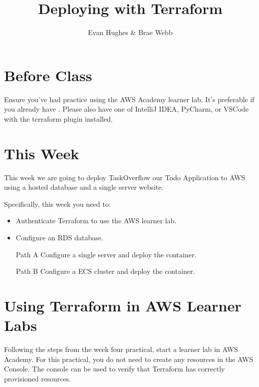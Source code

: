 \documentclass{csse4400}
\title{Deploying with Terraform}
\author{Evan Hughes \& Brae Webb}
\date{\week{3}}
\begin{document}
\maketitle

\section{Before Class}
Ensure you've had practice using the AWS Academy learner lab.
It's preferable if you already have .
Please also have one of IntelliJ IDEA, PyCharm, or VSCode with the terraform plugin installed.

\section{This Week}
This week we are going to deploy TaskOverflow our Todo Application to AWS using a hosted database and a single server website.

Specifically, this week you need to:
\begin{itemize}
    \item Authenticate Terraform to use the AWS learner lab.
    \item Configure an RDS database.
    \item [Path A] Configure a single server and deploy the container.
    \item [Path B] Configure a ECS cluster and deploy the container.
\end{itemize}

\section{Using Terraform in AWS Learner Labs}
Following the steps from the week four practical, start a learner lab in AWS Academy.
For this practical, you do not need to create any resources in the AWS Console.
The console can be used to verify that Terraform has correctly provisioned resources.
\end{document}
